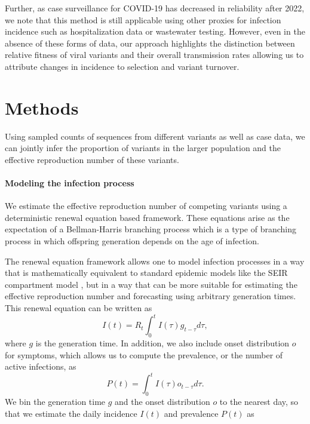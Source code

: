 Further, as case surveillance for COVID-19 has decreased in reliability after 2022, we note that this method is still applicable using other proxies for infection incidence such as hospitalization data or wastewater testing.
However, even in the absence of these forms of data, our approach highlights the distinction between relative fitness of viral variants and their overall transmission rates allowing us to attribute changes in incidence to selection and variant turnover.

\section{Methods}

Using sampled counts of sequences from different variants as well as case data, we can jointly infer the proportion of variants in the larger population and the effective reproduction number of these variants.

\paragraph{Modeling the infection process}%

We estimate the effective reproduction number of competing variants using a deterministic renewal equation based framework. These equations arise as the expectation of a Bellman-Harris branching process \cite{Bellman1948} which is a type of branching process in which offspring generation depends on the age of infection.

The renewal equation framework allows one to model infection processes in a way that is mathematically equivalent to standard epidemic models like the SEIR compartment model \cite{Champredon2018}, but in a way that can be more suitable for estimating the effective reproduction number and forecasting using arbitrary generation times. This renewal equation can be written as
\begin{equation}
  I(t) = R_{t} \int_{0}^{t} I(\tau)g_{t-\tau} d\tau,
\end{equation}
where $g$ is the generation time.
In addition, we also include onset distribution $o$ for symptoms, which allows us to compute the prevalence, or the number of active infections, as
\begin{equation}
  P(t) = \int_{0}^{t} I(\tau) o_{t-\tau} d \tau.
\end{equation}
We bin the generation time $g$ and the onset distribution $o$ to the nearest day, so that we estimate the daily incidence $I(t)$ and prevalence $P(t)$ as

